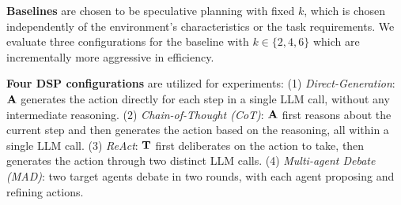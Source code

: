 \textbf{Baselines} are chosen to be speculative planning with fixed $k$, which is chosen independently of the environment’s characteristics or the task requirements.
We evaluate three configurations for the baseline with $k\in\{2, 4, 6\}$ which are incrementally more aggressive in efficiency.

\textbf{Four DSP configurations} are utilized for experiments: (1) \emph{Direct-Generation}: ${\mathbf{A}}$ generates the action directly for each step in a single LLM call, without any intermediate reasoning. (2) \emph{Chain-of-Thought (CoT)}: ${\mathbf{A}}$ first reasons about the current step and then generates the action based on the reasoning, all within a single LLM call. (3) \emph{ReAct}: ${\mathbf{T}}$ first deliberates on the action to take, then generates the action through two distinct LLM calls. (4) \emph{Multi-agent Debate (MAD)}: two target agents debate in two rounds, with each agent proposing and refining actions.%




